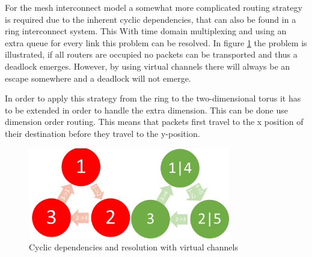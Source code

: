 \documentclass[journal,10pt,twoside, a4paper]{IEEEtran}
\begin{document}
For the mesh interconnect model a somewhat more complicated routing strategy is required due to the inherent cyclic dependencies, that can also be found in a ring interconnect system. This  With time domain multiplexing and using an extra queue for every link this problem can be resolved. In figure \ref{fig:cycDepend} the problem is illustrated, if all routers are occupied no packets can be transported and thus a deadlock emerges. However, by using virtual channels there will always be an escape somewhere and a deadlock will not emerge.

In order to apply this strategy from the ring to the two-dimensional torus it has to be extended in order to handle the extra dimension. This can be done use dimension order routing. This means that packets first travel to the x position of their destination before they travel to the y-position.  

\begin{figure}
    \centering
    \includegraphics[width = 250pt]{cyclic.png}
    \caption{Cyclic dependencies and resolution with virtual channels}
    \label{fig:cycDepend}
\end{figure}
\end{document}
